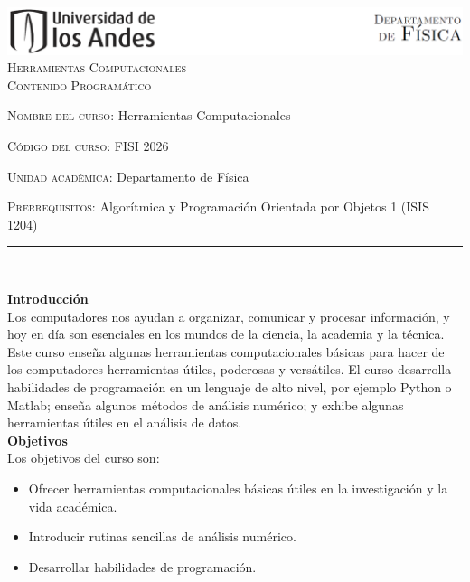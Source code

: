 \documentclass[letterpaper,10pt,onecolumn]{article}
\begin{document}
\begin{center}

\includegraphics[width=490pt]{header.png}\\[0.5cm]

\textsc{\huge Herramientas Computacionales}\\[0.1cm]

\Large \textsc{Contenido Programático}\\[0.7cm]

\end{center}

\large \noindent\textsc{Nombre del curso:} Herramientas Computacionales
	 
\noindent\textsc{Código del curso:} FISI 2026

\noindent\textsc{Unidad académica:} Departamento de Física

\noindent\textsc{Prerrequisitos:} Algorítmica y Programación Orientada por Objetos 1 (ISIS 1204)

\noindent\rule{\textwidth}{1pt}\\[-0.1cm]

\addtocounter{mysection}{1}

\noindent\textbf{\large {} \quad Introducción}\\[-0.2cm]

\noindent\normalsize Los computadores nos ayudan a organizar,
comunicar y procesar información, y hoy en día son esenciales en los
mundos de la ciencia, la academia y la técnica. Este curso enseña
algunas herramientas computacionales básicas para hacer de los
computadores herramientas útiles, poderosas y versátiles. El curso
desarrolla habilidades de programación en un lenguaje de alto nivel,
por ejemplo Python o Matlab; enseña algunos métodos de análisis
numérico; y exhibe algunas herramientas útiles en el análisis de
datos. \\[0.1cm] 

\noindent\textbf{\large {} \quad Objetivos}\\[-0.2cm]

\noindent\normalsize Los objetivos del curso son:

\begin{itemize}
	\item Ofrecer herramientas computacionales básicas útiles en la investigación y la vida académica.\\[-0.6cm]
	\item Introducir rutinas sencillas de análisis numérico.\\[-0.6cm]
	\item Desarrollar habilidades de programación.\\[-0.2cm]
\end{itemize}
\end{document}
